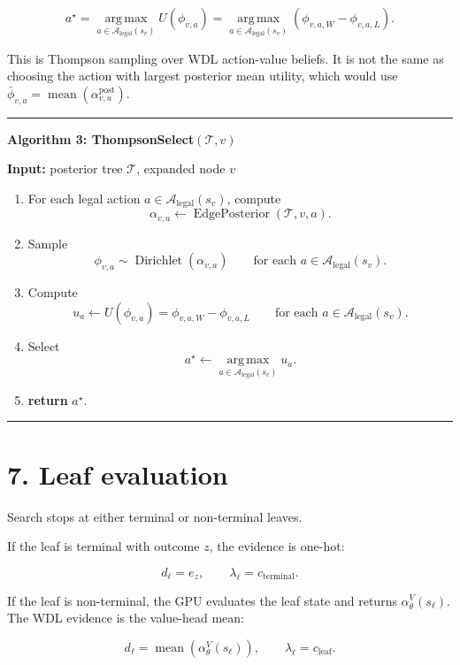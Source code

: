 \documentclass[11pt]{article}
\newcommand{\Dir}{\operatorname{Dirichlet}}
\newcommand{\argmax}{\operatorname*{arg\,max}}
\newcommand{\mean}{\operatorname{mean}}
\newcommand{\Tree}{\mathcal{T}}
\newcommand{\Legal}{\mathcal{A}_{\mathrm{legal}}}
\newcommand{\Utility}{U}
\newcommand{\EdgePosterior}{\operatorname{EdgePosterior}}
\newenvironment{algorithmblock}[1]
{
  \par\medskip
  \noindent\hrule\par\smallskip
  \noindent\textbf{#1}
  \par\smallskip
}
{
  \par\smallskip\noindent\hrule\par\medskip
}
\newcommand{\Input}{\textbf{Input: }}
\newcommand{\Return}{\textbf{return }}
\begin{document}
\[
a^\star
=
\argmax_{a \in \Legal(s_v)}
\Utility(\phi_{v,a})
=
\argmax_{a \in \Legal(s_v)}
\left(
\phi_{v,a,W}-\phi_{v,a,L}
\right).
\]

This is Thompson sampling over WDL action-value beliefs. It is not the same as
choosing the action with largest posterior mean utility, which would use
\(\bar\phi_{v,a}=\mean(\alpha^{\mathrm{post}}_{v,a})\).

\begin{algorithmblock}{Algorithm 3: ThompsonSelect\((\Tree,v)\)}

\Input posterior tree \(\Tree\), expanded node \(v\)

\begin{enumerate}[leftmargin=2em]
  \item For each legal action \(a \in \Legal(s_v)\), compute
  \[
  \alpha_{v,a}
  \gets
  \EdgePosterior(\Tree,v,a).
  \]

  \item Sample
  \[
  \phi_{v,a}
  \sim
  \Dir(\alpha_{v,a})
  \qquad
  \text{for each } a \in \Legal(s_v).
  \]

  \item Compute
  \[
  u_a
  \gets
  \Utility(\phi_{v,a})
  =
  \phi_{v,a,W}-\phi_{v,a,L}
  \qquad
  \text{for each } a \in \Legal(s_v).
  \]

  \item Select
  \[
  a^\star
  \gets
  \argmax_{a \in \Legal(s_v)} u_a.
  \]

  \item \Return \(a^\star\).
\end{enumerate}

\end{algorithmblock}

\section*{7. Leaf evaluation}

Search stops at either terminal or non-terminal leaves.

If the leaf is terminal with outcome \(z\), the evidence is one-hot:

\[
d_\ell = e_z,
\qquad
\lambda_\ell = c_{\mathrm{terminal}}.
\]

If the leaf is non-terminal, the GPU evaluates the leaf state and returns
\(\alpha_\theta^V(s_\ell)\). The WDL evidence is the value-head mean:

\[
d_\ell
=
\mean
\left(
\alpha_\theta^V(s_\ell)
\right),
\qquad
\lambda_\ell = c_{\mathrm{leaf}}.
\]
\end{document}
